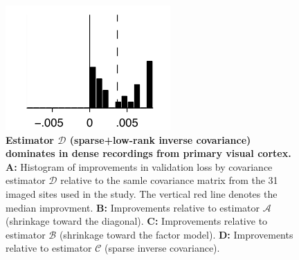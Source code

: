 \begin{figure}[htp]
\centering
\includegraphics{figures/Domination.pdf}
\caption{{\bf Estimator $\mathcal D$ (sparse+low-rank inverse covariance) dominates in dense recordings from primary visual cortex.}
{\bf A:}  Histogram of improvements in validation loss by covariance estimator $\mathcal D$ relative to the samle covariance matrix from the 31 imaged sites used in the study.  The vertical red line denotes the median improvment. 
{\bf B:} Improvements relative to estimator $\mathcal A$ (shrinkage toward the diagonal).
{\bf C:} Improvements relative to estimator $\mathcal B$ (shrinkage toward the factor model).
{\bf D:} Improvements relative to estimator $\mathcal C$ (sparse inverse covariance).
}\label{fig:04}
\end{figure}